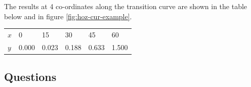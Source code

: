 \documentclass{bcrre_exam}
\begin{document}
The results at 4 co-ordinates along the transition curve are shown in the table below and in figure \ref{fig:hoz-cur-example}.

\begin{table}[h]
\centering
\begin{tabular}{@{}llllll@{}}
\toprule
$x$ & \num{0}     & \num{15}    & \num{30}    & \num{45}    & \num{60}    \\ 
$y$ & \num{0.000} & \num{0.023} & \num{0.188} & \num{0.633} & \num{1.500} \\ \bottomrule
\end{tabular}
\end{table}

\subsection*{Questions}
\end{document}
